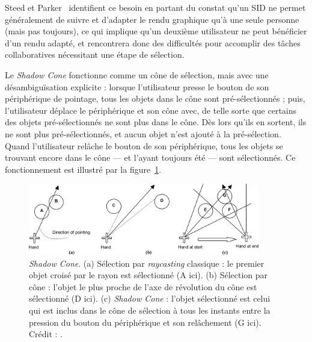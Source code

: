 	Steed et Parker~\cite{steed20043d} identifient ce besoin en partant du constat qu'un SID ne permet généralement de suivre et d'adapter le rendu graphique qu'à une seule personne (mais pas toujours\footnotemark), ce qui implique qu'un deuxième utilisateur ne peut bénéficier d'un rendu adapté, et rencontrera donc des difficultés pour accomplir des tâches collaboratives nécessitant une étape de sélection.
	
	
	Le \emph{Shadow Cone} fonctionne comme un cône de sélection, mais avec une désambiguïsation explicite : lorsque l'utilisateur presse le bouton de son périphérique de pointage, tous les objets dans le cône sont pré-sélectionnés ; puis, l'utilisateur déplace le périphérique et son cône avec, de telle sorte que certains des objets pré-sélectionnés ne sont plus dans le cône. Dès lors qu'ils en sortent, ils ne sont plus pré-sélectionnés, et aucun objet n'est ajouté à la pré-sélection. Quand l'utilisateur relâche le bouton de son périphérique, tous les objets se trouvant encore dans le cône --- et l'ayant toujours été --- sont sélectionnés. Ce fonctionnement est illustré par la figure~\ref{fig:shadow}.
	
	\begin{figure}[!htb]
		\centering
		\includegraphics[width=0.9\textwidth]{figures/ch2/shadow}
		\caption[Fonctionnement du \emph{Shadow Cone}]{\emph{Shadow Cone}. (a) Sélection par \emph{raycasting} classique : le premier objet croisé par le rayon est sélectionné (A ici). (b) Sélection par cône : l'objet le plus proche de l'axe de révolution du cône est sélectionné (D ici). (c) \emph{Shadow Cone} : l'objet sélectionné est celui qui est inclus dans le cône de sélection à tous les instants entre la pression du bouton du périphérique et son relâchement (G ici). Crédit : \cite{steed20043d}.}
		\label{fig:shadow}
	\end{figure}
	
